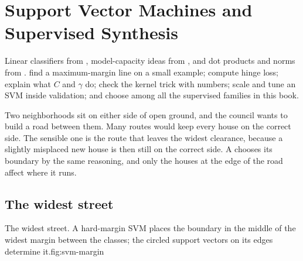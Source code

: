 \chapter{Support Vector Machines and Supervised Synthesis}
\label{ch:svm}

\chapterguide%
  {Linear classifiers from , model-capacity ideas from , and dot products and norms from .}
  {find a maximum-margin line on a small example; compute hinge loss; explain what $C$ and $\gamma$ do; check the kernel trick with numbers; scale and tune an SVM inside validation; and choose among all the supervised families in this book.}

Two neighborhoods sit on either side of open ground, and the council wants to build a road between them. Many routes would keep every house on the correct side. The sensible one is the route that leaves the widest clearance, because a slightly misplaced new house is then still on the correct side. A  chooses its boundary by the same reasoning, and only the houses at the edge of the road affect where it runs.

\section{The widest street}

\begin{utpfig}{The widest street. A hard-margin SVM places the boundary in the middle of the widest margin between the classes; the circled support vectors on its edges determine it.}{fig:svm-margin}
\end{utpfig}

